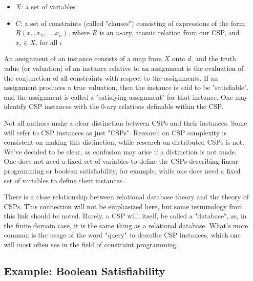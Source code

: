 \begin{itemize}
  \item $X$: a set of variables
  \item $C$: a set of constraints (called "clauses") consisting of expressions of the form $R(x_1,x_2,...,x_n)$, where $R$ is an $n$-ary, atomic relation from our CSP, and $x_i \in X$, for all $i$
\end{itemize}

An assignment of an instance consists of a map from $X$ onto $d$, and the truth value (or valuation) of an instance relative to an assignment is the evaluation of the conjunction of all constraints with respect to the assignments. If an assignment produces a true valuation, then the instance is said to be "satisfiable", and the assignment is called a "satisfying assignment" for that instance. One may identify CSP instances with the 0-ary relations definable within the CSP.

\begin{remark}\label{remark:instance-terminology}
Not all authors make a clear distinction between CSPs and their instances. Some will refer to CSP instances as just "CSPs". Research on CSP complexity is consistent on making this distinction, while research on distributed CSPs is not. We've decided to be clear, as confusion may arise if a distinction is not made. One does not need a fixed set of variables to define the CSPs describing linear programming or boolean satisfiability, for example, while one does need a fixed set of variables to define their instances.
\end{remark}

\begin{remark}\label{remark:relational-database-terminology}
There is a close relationship between relational database theory and the theory of CSPs. This connection will not be emphasized here, but some terminology from this link should be noted. Rarely, a CSP will, itself, be called a "database", as, in the finite domain case, it is the same thing as a relational database. What's more common is the usage of the word "query" to describe CSP instances, which one will most often see in the field of constraint programming.
\end{remark}

\subsection{Example: Boolean Satisfiability}\label{sec:two-sat}

